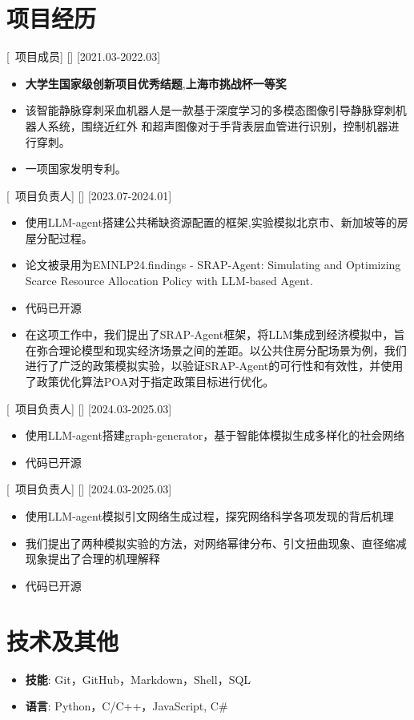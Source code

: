 \documentclass{resume}
\begin{document}
\section{项目经历}

[\ 项目成员]
[]
[2021.03-2022.03]
\begin{itemize}
  \item \textbf{大学生国家级创新项目优秀结题},\textbf{上海市挑战杯一等奖}
  \item 该智能静脉穿刺采血机器人是一款基于深度学习的多模态图像引导静脉穿刺机器人系统，围绕近红外
  和超声图像对于手背表层血管进行识别，控制机器进行穿刺。
  \item 一项国家发明专利。
\end{itemize}

[\ 项目负责人]
[]
[2023.07-2024.01]
\begin{itemize}
  \item 使用LLM-agent搭建公共稀缺资源配置的框架,实验模拟北京市、新加坡等的房屋分配过程。
  \item 论文被录用为EMNLP24.findings - SRAP-Agent: Simulating and Optimizing Scarce Resource Allocation Policy with LLM-based Agent.  
  \item 代码已开源 
  \item 在这项工作中，我们提出了SRAP-Agent框架，将LLM集成到经济模拟中，旨在弥合理论模型和现实经济场景之间的差距。以公共住房分配场景为例，我们进行了广泛的政策模拟实验，以验证SRAP-Agent的可行性和有效性，并使用了政策优化算法POA对于指定政策目标进行优化。
\end{itemize}

[\ 项目负责人]
[]
[2024.03-2025.03]
\begin{itemize}
  \item 使用LLM-agent搭建graph-generator，基于智能体模拟生成多样化的社会网络
  \item 代码已开源
\end{itemize}

[\ 项目负责人]
[]
[2024.03-2025.03]
\begin{itemize}
  \item 使用LLM-agent模拟引文网络生成过程，探究网络科学各项发现的背后机理
  \item 我们提出了两种模拟实验的方法，对网络幂律分布、引文扭曲现象、直径缩减现象提出了合理的机理解释
  \item 代码已开源
\end{itemize}

\section[技术及其他]{技术及其他}
\begin{itemize}
  \item \textbf{技能}: Git，GitHub，Markdown，Shell，SQL
  \item \textbf{语言}: Python，C/C++，JavaScript, C#
\end{itemize}
\end{document}
